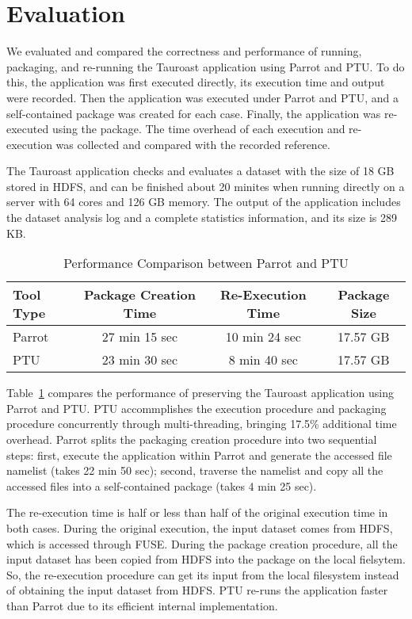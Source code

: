 \section{Evaluation}

We evaluated and compared the correctness and performance of running, packaging, and re-running the Tauroast application using Parrot and PTU.
To do this, the application was first executed directly, its execution time and output were recorded. Then the application was executed under Parrot and PTU, and a self-contained package was created for each case. Finally, the application was re-executed using the package. The time overhead of each execution and re-execution was collected and compared with the recorded reference.

The Tauroast application checks and evaluates a dataset with the size of 18 GB stored in HDFS, and can be finished about 20 minites when running directly on a server with 64 cores and 126 GB memory. The output of the application includes the dataset analysis log and a complete statistics information, and its size is 289 KB.

\begin{table}
    \centering
    \begin{tabular}{lccc}
    \hline
    \bf Tool Type & \bf Package Creation Time & \bf Re-Execution Time & \bf Package Size \\ \hline
	Parrot & 27 min 15 sec & 10 min 24 sec & 17.57 GB \\ \hline
	PTU & 23 min 30 sec & 8 min 40 sec & 17.57 GB \\ \hline 
    \end{tabular}
    \caption{Performance Comparison between Parrot and PTU}
    \label{table:parrot_ptu}
\end{table}    

Table~\ref{table:parrot_ptu} compares the performance of preserving the Tauroast application using Parrot and PTU.
PTU accommplishes the execution procedure and packaging procedure concurrently through multi-threading, bringing 17.5\% additional time overhead.
Parrot splits the packaging creation procedure into two sequential steps: first, execute the application within Parrot and generate the accessed file namelist (takes 22 min 50 sec); second, traverse the namelist and copy all the accessed files into a self-contained package (takes 4 min 25 sec).

The re-execution time is half or less than half of the original execution time in both cases. During the original execution, the input dataset comes from HDFS, which is accessed through FUSE. During the package creation procedure, all the input dataset has been copied from HDFS into the package on the local fielsytem. So, the re-execution procedure can get its input from the local filesystem instead of obtaining the input dataset from HDFS.
PTU re-runs the application faster than Parrot due to its efficient internal implementation.

